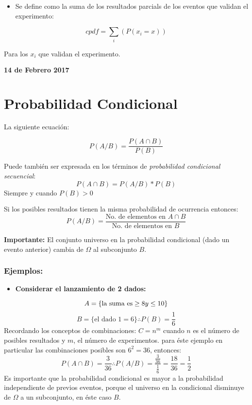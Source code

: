 \documentclass[]{book}
\providecommand{\tightlist}{%
  \setlength{\itemsep}{0pt}\setlength{\parskip}{0pt}}
\begin{document}
\begin{itemize}
\tightlist
\item
  Se define como la suma de los resultados parcials de los eventos que
  validan el experimento:
\end{itemize}

\[cpdf = \sum_{i}(P(x_i=x))\]

Para los \(x_i\) que validan el experimento.

\textbf{14 de Febrero 2017}

\section{Probabilidad Condicional}\label{probabilidad-condicional-2}

La siguiente ecuación:

\[P(A/B) = \frac{P(A\cap B)}{P(B)}\]

Puede también ser expresada en los términos de \emph{probabilidad
condicional secuencial}: \[P(A\cap B) = P(A/B)*P(B)\] Siempre y cuando
\(P(B)>0\)

Si los posibles resultados tienen la misma probabilidad de ocurrencia
entonces:
\[P(A/B) = \frac{\text{No. de elementos en } A\cap B}{\text{No. de elementos en }B}\]

\textbf{Importante:} El conjunto universo en la probabilidad condicional
(dado un evento anterior) cambia de \(\Omega\) al subconjunto \(B\).

\subsubsection{Ejemplos:}\label{ejemplos-2}

\begin{itemize}
\tightlist
\item
  \textbf{Considerar el lanzamiento de 2 dados:}
\end{itemize}

\[A = \{\text{la suma es}\geq 8 \space y \space \leq 10\}\]
\[B = \{\text{el dado 1}=6 \} \therefore P(B) = \frac {1}{6}\]
Recordando los conceptos de combinaciones: \(C = n^m\) cuando \(n\) es
el número de posibles resultados y \(m\), el número de experimentos.
para éste ejemplo en particular las combinaciones posibles son
\(6^2 = 36\), entonces:
\[P(A\cap B) = \frac {3}{36} \therefore P(A/B) = \frac {\frac {3}{36}}{\frac {1}{6}} = \frac {18}{36} = \frac {1}{2}\]
Es importante que la probabilidad condicional es mayor a la probabilidad
independiente de previos eventos, porque el universo en la condicional
disminuye de \(\Omega\) a un subconjunto, en éste caso \(B\).
\end{document}
